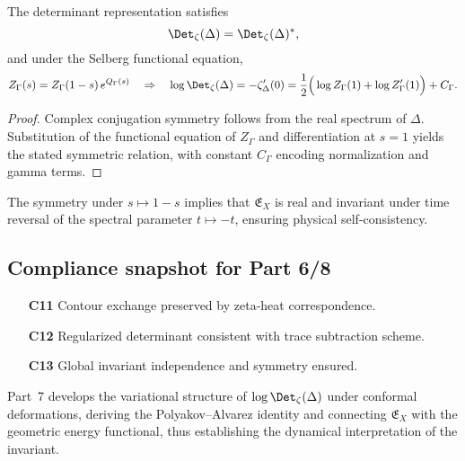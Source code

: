\begin{lemma}
\label{lem:det-symmetry}
The determinant representation satisfies
\[
\Det_\zeta(\Delta) = \Det_\zeta(\Delta)^*,
\]
and under the Selberg functional equation,
\[
Z_\Gamma(s)=Z_\Gamma(1-s)\,e^{Q_\Gamma(s)}
\quad\Rightarrow\quad
\log\Det_\zeta(\Delta)
=-\zeta_\Delta'(0)
=\frac{1}{2}\Big(\log Z_\Gamma(1)+\log Z_\Gamma'(1)\Big)+C_\Gamma.
\]
\end{lemma}

\begin{proof}\relax
Complex conjugation symmetry follows from the real spectrum of $\Delta$. Substitution of the functional equation of $Z_\Gamma$ and differentiation at $s=1$ yields the stated symmetric relation, with constant $C_\Gamma$ encoding normalization and gamma terms. \relax
\end{proof}

\begin{invariant}
The symmetry under $s\mapsto1-s$ implies that $\mathfrak{E}_X$ is real and invariant under time reversal of the spectral parameter $t\mapsto -t$, ensuring physical self-consistency. \relax
\end{invariant}

\subsection{Compliance snapshot for Part 6/8}
\label{subsec:ch4-part6-compliance} \relax

\begin{itemize}
  \item[\textbf{C11}] Contour exchange preserved by zeta-heat correspondence. %
  \item[\textbf{C12}] Regularized determinant consistent with trace subtraction scheme. %
  \item[\textbf{C13}] Global invariant independence and symmetry ensured. %
\end{itemize}

\begin{remark}
\label{rem:forward-part7}
Part~7 develops the variational structure of $\log\Det_\zeta(\Delta)$ under conformal deformations, deriving the Polyakov–Alvarez identity and connecting $\mathfrak{E}_X$ with the geometric energy functional, thus establishing the dynamical interpretation of the invariant. \relax
\end{remark}

